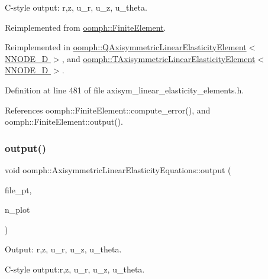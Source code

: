 C-\/style output\+: r,z, u\+\_\+r, u\+\_\+z, u\+\_\+theta. 



Reimplemented from \hyperlink{classoomph_1_1FiniteElement_a72cddd09f8ddbee1a20a1ff404c6943e}{oomph\+::\+Finite\+Element}.



Reimplemented in \hyperlink{classoomph_1_1QAxisymmetricLinearElasticityElement_abc4653b755224731a24d641619b2c14e}{oomph\+::\+Q\+Axisymmetric\+Linear\+Elasticity\+Element$<$ N\+N\+O\+D\+E\+\_\+D $>$}, and \hyperlink{classoomph_1_1TAxisymmetricLinearElasticityElement_a8a33c1d33c51c47f563aed46f5a9d835}{oomph\+::\+T\+Axisymmetric\+Linear\+Elasticity\+Element$<$ N\+N\+O\+D\+E\+\_\+D $>$}.



Definition at line 481 of file axisym\+\_\+linear\+\_\+elasticity\+\_\+elements.\+h.



References oomph\+::\+Finite\+Element\+::compute\+\_\+error(), and oomph\+::\+Finite\+Element\+::output().

\mbox{\label{classoomph_1_1AxisymmetricLinearElasticityEquations_ae706158f52c6251de990b640787e608b}} 
\subsubsection{\texorpdfstring{output()}{output()}\hspace{0.1cm}{\footnotesize\ttfamily [4/4]}}
{\footnotesize\ttfamily void oomph\+::\+Axisymmetric\+Linear\+Elasticity\+Equations\+::output (\begin{DoxyParamCaption}\item[{F\+I\+LE $\ast$}]{file\+\_\+pt,  }\item[{const unsigned \&}]{n\+\_\+plot }\end{DoxyParamCaption})\hspace{0.3cm}{\ttfamily [virtual]}}



Output\+: r,z, u\+\_\+r, u\+\_\+z, u\+\_\+theta. 

C-\/style output\+:r,z, u\+\_\+r, u\+\_\+z, u\+\_\+theta. 

